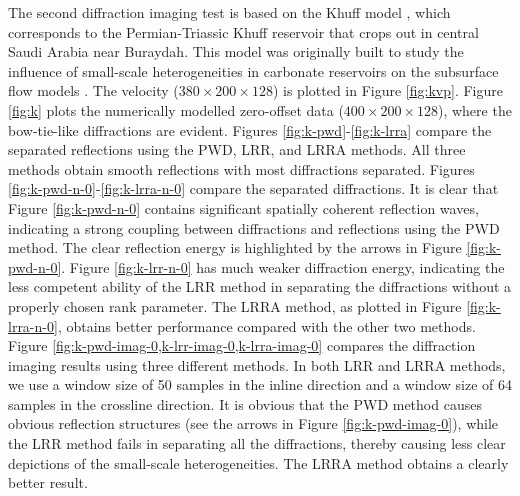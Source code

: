 The second diffraction imaging test is based on the Khuff model \cite[]{decker2015carbonate,janson2013outcrop}, which corresponds to the Permian-Triassic Khuff reservoir that crops out in central Saudi Arabia near Buraydah. This model was originally built to study the influence of small-scale heterogeneities in carbonate reservoirs on the subsurface flow models \cite[]{janson2013outcrop}. The velocity ($380\times200\times 128$) is plotted in Figure \ref{fig:kvp}. Figure \ref{fig:k} plots the numerically modelled zero-offset data ($400\times200\times 128$), where the bow-tie-like diffractions are evident. Figures \ref{fig:k-pwd}-\ref{fig:k-lrra} compare the separated reflections using the PWD, LRR, and LRRA methods.  All three methods obtain smooth reflections with most diffractions separated. Figures \ref{fig:k-pwd-n-0}-\ref{fig:k-lrra-n-0} compare the separated diffractions. It is clear that Figure \ref{fig:k-pwd-n-0} contains significant spatially coherent reflection waves, indicating a strong coupling between diffractions and reflections using the PWD method. The clear reflection energy is highlighted by the arrows in Figure \ref{fig:k-pwd-n-0}. Figure \ref{fig:k-lrr-n-0} has much weaker diffraction energy, indicating the less competent ability of the LRR method in separating the diffractions without a properly chosen rank parameter. The LRRA method, as plotted in Figure \ref{fig:k-lrra-n-0}, obtains better performance compared with the other two methods. Figure \ref{fig:k-pwd-imag-0,k-lrr-imag-0,k-lrra-imag-0} compares  the diffraction imaging results using three different methods. In both LRR and LRRA methods, we use a window size of 50 samples in the inline direction and a window size of 64 samples in the crossline direction. It is obvious that the PWD method causes obvious reflection structures (see the arrows in Figure \ref{fig:k-pwd-imag-0}), while the LRR method fails in separating all the diffractions, thereby causing less clear depictions of the small-scale heterogeneities. The LRRA method obtains a clearly better result.  






